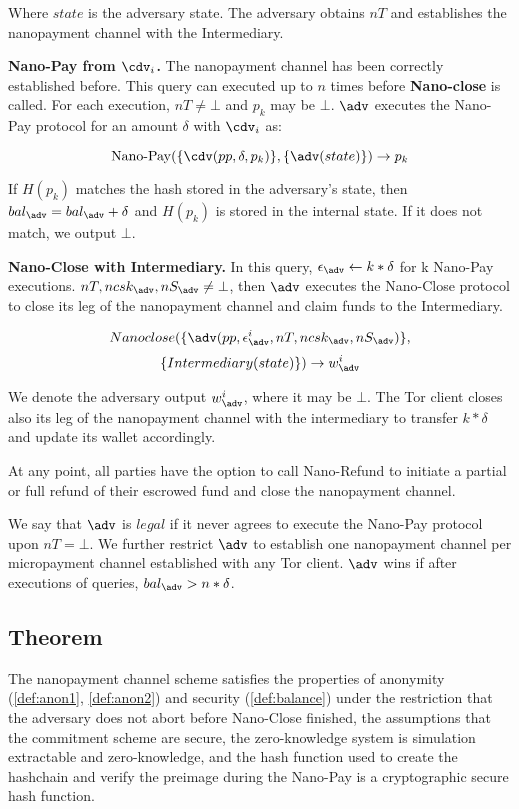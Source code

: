 Where $state$ is the adversary state. The adversary obtains $nT$ and establishes the nanopayment channel with the Intermediary.

\textbf{Nano-Pay from $\cdv_i$.} The nanopayment channel has been correctly
established before. This query can executed up to $n$ times before
\textbf{Nano-close} is called. For each execution, $nT \neq \bot$ and $p_k$ may
be $\bot$.  $\adv$ executes the Nano-Pay protocol for an amount $\delta$ with
$\cdv_i$ as:

$$\operatorname{Nano-Pay}(\{\cdv(pp,\delta,p_k)\},\{\adv(state)\}) \rightarrow p_k$$

If $H(p_k)$ matches the hash stored in the adversary's state, then $bal_\adv = bal_\adv+\delta$ and $H(p_k)$ is stored in the internal state. If it does not match, we output $\bot$.

\textbf{Nano-Close with Intermediary.} In this query, $\epsilon_\adv \leftarrow k*\delta$ for k Nano-Pay executions. $nT, ncsk_\adv, nS_\adv \neq \bot$, then $\adv$ executes the Nano-Close protocol to close its leg of the nanopayment channel and claim funds to the Intermediary.

$$Nano\-close(\{\adv(pp, \epsilon^i_\adv, nT, ncsk_\adv, nS_\adv)\},$$
$$\{Intermediary(state)\}) \rightarrow w^i_\adv$$

We denote the adversary output $w^i_\adv$, where it may be $\bot$. The Tor client closes also its leg of the nanopayment channel with the intermediary to transfer $k*\delta$ and update its wallet accordingly.

At any point, all parties have the option to call Nano-Refund to initiate a partial or full refund of their escrowed fund and close the nanopayment channel.

We say that $\adv$ is $legal$ if it never agrees to execute the Nano-Pay protocol upon $nT = \bot$. We further restrict $\adv$ to establish one nanopayment channel per micropayment channel established with any Tor client. $\adv$ wins if after executions of queries, $bal_\adv > n*\delta$.

\subsection{Theorem}
The nanopayment channel scheme satisfies the properties of anonymity
(\ref{def:anon1}, \ref{def:anon2}) and security (\ref{def:balance}) under the
restriction that the adversary does not abort before Nano-Close finished, the
assumptions that the commitment scheme are secure, the zero-knowledge system is
simulation extractable and zero-knowledge, and the hash function used to create
the hashchain and verify the preimage during the Nano-Pay is a cryptographic
secure hash function.

